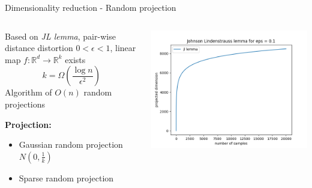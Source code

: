 \begin{frame}{Dimensionality reduction - Random projection}
    \begin{columns}
    \begin{column}{0.5\textwidth}
        Based on \emph{JL lemma}, pair-wise distance distortion $0 < \epsilon < 1$, linear map $f: \mathbb{R}^d \to \mathbb{R}^k$ exists
        \begin{equation}
            k = \Omega ( \frac{\log n}{\epsilon^2} )
        \end{equation}
        Algorithm of $O(n)$ random projections
        
        \textbf{Projection:}
        \begin{itemize}
            \item Gaussian random projection $N(0, \frac{1}{k})$
            \item Sparse random projection
        \end{itemize}
    \end{column}
    \begin{column}{0.5\textwidth}
        \begin{center}
            \includegraphics[width=1.0\textwidth]{assets/jl_lemma.png}
        \end{center}
    \end{column}
    \end{columns}
\end{frame}


